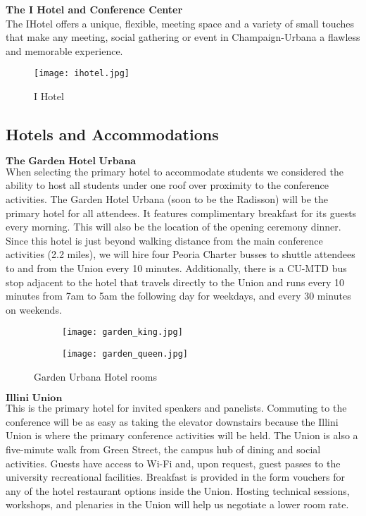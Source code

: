 \textbf{The I Hotel and Conference Center}\\
The IHotel offers a unique, flexible, meeting space and a variety of small touches that make any meeting, social gathering or event in Champaign-Urbana a flawless and memorable experience.\\

\begin{figure}[H]
    \centering
    \texttt{[image: ihotel.jpg]}
    \caption{I Hotel}
    \label{fig:beckman}
\end{figure}

\newpage
\subsection{Hotels and Accommodations}

$\textbf{The Garden Hotel Urbana}$\\
When selecting the primary hotel to accommodate students we considered the ability to host all students under one roof over proximity to the conference activities. The Garden Hotel Urbana (soon to be the Radisson) will be the primary hotel for all attendees. It features complimentary breakfast for its guests every morning. This will also be the location of the opening ceremony dinner. Since this hotel is just beyond walking distance from the main conference activities (2.2 miles), we will hire four Peoria Charter busses to shuttle attendees to and from the Union every 10 minutes. Additionally, there is a CU-MTD bus stop adjacent to the hotel that travels directly to the Union and runs every 10 minutes from 7am to 5am the following day for weekdays, and every 30 minutes on weekends. \\ 
\begin{figure}[H]
	\centering
	\begin{subfigure}{0.5\textwidth}
		\centering
		\texttt{[image: garden\_king.jpg]}
	\end{subfigure}%
	\begin{subfigure}{0.5\textwidth}
		\centering
		\texttt{[image: garden\_queen.jpg]}
	\end{subfigure}
	\caption{Garden Urbana Hotel rooms}		
\end{figure} 

$\textbf{Illini Union}$\\
This is the primary hotel for invited speakers and panelists. Commuting to the conference will be as easy as taking the elevator downstairs because the Illini Union is where the primary conference activities will be held. The Union is also a five-minute walk from Green Street, the campus hub of dining and social activities. Guests have access to Wi-Fi and, upon request, guest passes to the university recreational facilities. Breakfast is provided in the form vouchers for any of the hotel restaurant options inside the Union. Hosting technical sessions, workshops, and plenaries in the Union will help us negotiate a lower room rate.\\

